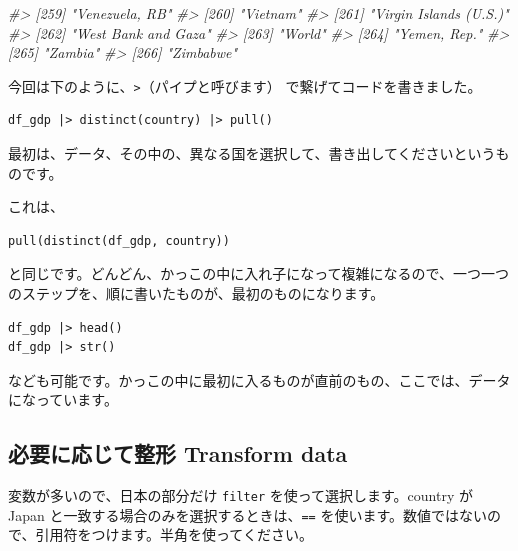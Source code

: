 \documentclass[
  xelatex, ja=standard]{bxjsbook}
\newenvironment{Shaded}{\begin{snugshade}}{\end{snugshade}}
\newcommand{\CommentTok}[1]{\textcolor[rgb]{0.56,0.35,0.01}{\textit{#1}}}
\theoremstyle{definition}
\theoremstyle{definition}
\theoremstyle{definition}
\theoremstyle{definition}
\theoremstyle{remark}
\begin{document}
\begin{Shaded}
\begin{Highlighting}[]
\CommentTok{\#\textgreater{} [259] "Venezuela, RB"                                       }
\CommentTok{\#\textgreater{} [260] "Vietnam"                                             }
\CommentTok{\#\textgreater{} [261] "Virgin Islands (U.S.)"                               }
\CommentTok{\#\textgreater{} [262] "West Bank and Gaza"                                  }
\CommentTok{\#\textgreater{} [263] "World"                                               }
\CommentTok{\#\textgreater{} [264] "Yemen, Rep."                                         }
\CommentTok{\#\textgreater{} [265] "Zambia"                                              }
\CommentTok{\#\textgreater{} [266] "Zimbabwe"}
\end{Highlighting}
\end{Shaded}

今回は下のように、\texttt{\textbar{}\textgreater{}}（パイプと呼びます） で繋げてコードを書きました。

\begin{verbatim}
df_gdp |> distinct(country) |> pull()
\end{verbatim}

最初は、データ、その中の、異なる国を選択して、書き出してくださいというものです。

これは、

\begin{verbatim}
pull(distinct(df_gdp, country))
\end{verbatim}

と同じです。どんどん、かっこの中に入れ子になって複雑になるので、一つ一つのステップを、順に書いたものが、最初のものになります。

\begin{verbatim}
df_gdp |> head()
df_gdp |> str()
\end{verbatim}

なども可能です。かっこの中に最初に入るものが直前のもの、ここでは、データになっています。

\hypertarget{ux5fc5ux8981ux306bux5fdcux3058ux3066ux6574ux5f62-transform-data}{%
\subsection{必要に応じて整形 Transform data}\label{ux5fc5ux8981ux306bux5fdcux3058ux3066ux6574ux5f62-transform-data}}

変数が多いので、日本の部分だけ \texttt{filter} を使って選択します。country が Japan と一致する場合のみを選択するときは、\texttt{==} を使います。数値ではないので、引用符をつけます。半角を使ってください。
\end{document}
